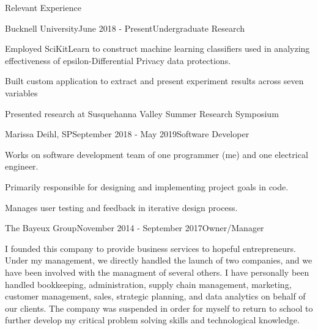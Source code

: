 \documentclass{resume} %
\begin{document}

\begin{rSection}{Relevant Experience}


\begin{rSubsection}{Bucknell University}{June 2018 - Present}{Undergraduate Research}{}
\item Employed SciKitLearn to construct machine learning classifiers used in analyzing effectiveness of epsilon-Differential Privacy data protections.
\item Built custom application to extract and present experiment results across seven variables
\item Presented research at Susquehanna Valley Summer Research Symposium
\end{rSubsection}


\begin{rSubsection}{Marissa Deihl, SP}{September 2018 - May 2019}{Software Developer}{}
\item Works on software development team of one programmer (me) and one electrical engineer.
\item Primarily responsible for designing and implementing project goals in code.
\item Manages user testing and feedback in iterative design process.
\end{rSubsection}


\begin{rSubsection}{The Bayeux Group}{November 2014 - September 2017}{Owner/Manager}{}
\item I founded this company to provide business services to hopeful entrepreneurs. Under my management, we directly handled the launch of two companies, and we have been involved with the managment of several others. I have personally been handled bookkeeping, administration, supply chain management, marketing, customer management, sales, strategic planning, and data analytics on behalf of our clients. The company was suspended in order for myself to return to school to further develop my critical problem solving skills and technological knowledge.
\end{rSubsection}


\end{rSection}
\end{document}
